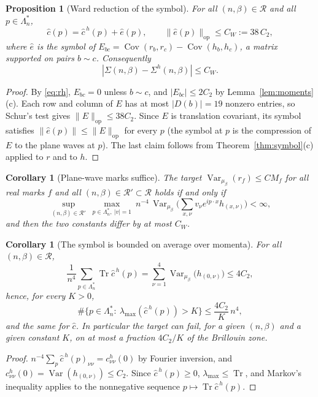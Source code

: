 \documentclass[11pt]{article}
\newtheorem{proposition}[theorem]{Proposition}
\newtheorem{corollary}[theorem]{Corollary}
\theoremstyle{definition}
\newcommand{\Var}{\operatorname{Var}}
\newcommand{\Cov}{\operatorname{Cov}}
\newcommand{\Tr}{\operatorname{Tr}}
\newcommand{\lam}{\lambda_{\max}}
\begin{document}
\begin{proposition}[Ward reduction of the symbol]\label{prop:ward-symbol}
For all $(n,\beta)\in\mathcal R$ and all $p\in\Lambda_n^*$,
\[
\hat c(p)=\hat c^{\,h}(p)+\hat e(p),\qquad \|\hat e(p)\|_{\mathrm{op}}\le C_W:=38\,C_2,
\]
where $\hat e$ is the symbol of $E_{bc}=\Cov(r_b,r_c)-\Cov(h_b,h_c)$, a matrix supported on pairs $b\sim c$.
Consequently
\[
|\Sigma(n,\beta)-\Sigma^h(n,\beta)|\le C_W .
\]
\end{proposition}
\begin{proof}
By \eqref{eq:rh}, $E_{bc}=0$ unless $b\sim c$, and $|E_{bc}|\le 2C_2$ by Lemma~\ref{lem:moments}(c). Each row and
column of $E$ has at most $|D(b)|=19$ nonzero entries, so Schur's test gives $\|E\|_{\mathrm{op}}\le 38C_2$.
Since $E$ is translation covariant, its symbol satisfies $\|\hat e(p)\|\le\|E\|_{\mathrm{op}}$ for every $p$ (the
symbol at $p$ is the compression of $E$ to the plane waves at $p$). The last claim follows from
Theorem~\ref{thm:symbol}(c) applied to $r$ and to $h$.
\end{proof}

\begin{corollary}[Plane-wave marks suffice]\label{cor:planewave}
The target $\Var_{\mu_\beta}(r_f)\le CM_f$ for all real marks $f$ and all $(n,\beta)\in\mathcal R'\subset\mathcal R$ holds
if and only if
\[
\sup_{(n,\beta)\in\mathcal R'}\ \max_{p\in\Lambda_n^*,\ |v|=1}\ n^{-4}\,
\Var_{\mu_\beta}\Big(\sum_{x,\nu}v_\nu e^{ip\cdot x}h_{(x,\nu)}\Big)<\infty ,
\]
and then the two constants differ by at most $C_W$.
\end{corollary}

\begin{corollary}[The symbol is bounded on average over momenta]\label{cor:mean}
For all $(n,\beta)\in\mathcal R$,
\[
\frac1{n^4}\sum_{p\in\Lambda_n^*}\Tr\hat c^{\,h}(p)=\sum_{\nu=1}^4\Var_{\mu_\beta}\big(h_{(0,\nu)}\big)\le 4C_2,
\]
hence, for every $K>0$,
\[
\#\{p\in\Lambda_n^*:\ \lam(\hat c^{\,h}(p))>K\}\le \frac{4C_2}{K}\,n^4,
\]
and the same for $\hat c$. In particular the target can fail, for a given $(n,\beta)$ and a given constant $K$,
on at most a fraction $4C_2/K$ of the Brillouin zone.
\end{corollary}
\begin{proof}
$n^{-4}\sum_p\hat c^{\,h}(p)_{\nu\nu}=c^h_{\nu\nu}(0)$ by Fourier inversion, and
$c^h_{\nu\nu}(0)=\Var(h_{(0,\nu)})\le C_2$. Since $\hat c^{\,h}(p)\ge0$, $\lam\le\Tr$, and Markov's inequality
applies to the nonnegative sequence $p\mapsto\Tr\hat c^{\,h}(p)$.
\end{proof}
\end{document}
